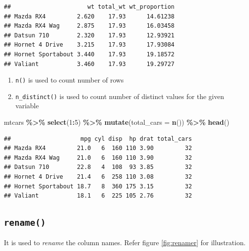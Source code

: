\documentclass[
]{book}
\newenvironment{Shaded}{\begin{snugshade}}{\end{snugshade}}
\newcommand{\AttributeTok}[1]{\textcolor[rgb]{0.13,0.29,0.53}{#1}}
\newcommand{\DecValTok}[1]{\textcolor[rgb]{0.00,0.00,0.81}{#1}}
\newcommand{\FunctionTok}[1]{\textcolor[rgb]{0.13,0.29,0.53}{\textbf{#1}}}
\newcommand{\NormalTok}[1]{#1}
\newcommand{\SpecialCharTok}[1]{\textcolor[rgb]{0.81,0.36,0.00}{\textbf{#1}}}
\providecommand{\tightlist}{%
  \setlength{\itemsep}{0pt}\setlength{\parskip}{0pt}}
\begin{document}
\begin{verbatim}
##                      wt total_wt wt_proportion
## Mazda RX4         2.620    17.93      14.61238
## Mazda RX4 Wag     2.875    17.93      16.03458
## Datsun 710        2.320    17.93      12.93921
## Hornet 4 Drive    3.215    17.93      17.93084
## Hornet Sportabout 3.440    17.93      19.18572
## Valiant           3.460    17.93      19.29727
\end{verbatim}

\begin{enumerate}
\def\labelenumi{\arabic{enumi}.}
\tightlist
\item
  \texttt{n()} is used to count number of rows
\item
  \texttt{n\_distinct()} is used to count number of distinct values for the given variable
\end{enumerate}

\begin{Shaded}
\begin{Highlighting}[]
\NormalTok{mtcars }\SpecialCharTok{\%\textgreater{}\%} 
  \FunctionTok{select}\NormalTok{(}\DecValTok{1}\SpecialCharTok{:}\DecValTok{5}\NormalTok{) }\SpecialCharTok{\%\textgreater{}\%} 
  \FunctionTok{mutate}\NormalTok{(}\AttributeTok{total\_cars =} \FunctionTok{n}\NormalTok{()) }\SpecialCharTok{\%\textgreater{}\%} 
  \FunctionTok{head}\NormalTok{()}
\end{Highlighting}
\end{Shaded}

\begin{verbatim}
##                    mpg cyl disp  hp drat total_cars
## Mazda RX4         21.0   6  160 110 3.90         32
## Mazda RX4 Wag     21.0   6  160 110 3.90         32
## Datsun 710        22.8   4  108  93 3.85         32
## Hornet 4 Drive    21.4   6  258 110 3.08         32
## Hornet Sportabout 18.7   8  360 175 3.15         32
## Valiant           18.1   6  225 105 2.76         32
\end{verbatim}

\hypertarget{rename}{%
\subsection{\texorpdfstring{\texttt{rename()}}{rename()}}\label{rename}}

It is used to \emph{rename} the column names. Refer figure \ref{fig:renamer} for illustration.
\end{document}
